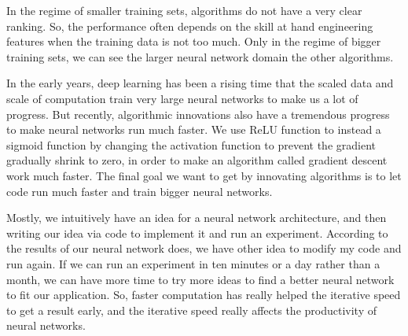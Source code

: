 \documentclass[a4paper]{article}
\begin{document}
In the regime of smaller training sets, algorithms do not have a very clear ranking. So, the performance often depends on the skill at hand engineering features when the training data is not too much. Only in the regime of bigger training sets, we can see the larger neural network domain the other algorithms. 

In the early years, deep learning has been a rising time that the scaled data and scale of computation train very large neural networks to make us a lot of progress. But recently, algorithmic innovations also have a tremendous progress to make neural networks run much faster. We use ReLU function to instead a sigmoid function by changing the activation function to prevent the gradient gradually shrink to zero, in order to make an algorithm called gradient descent work much faster. The final goal we want to get by innovating algorithms is to let code run much faster and train bigger neural networks. 

Mostly, we intuitively have an idea for a neural network architecture, and then writing our idea via code to implement it and run an experiment. According to the results of our neural network does, we have other idea to modify my code and run again. If we can run an experiment in ten minutes or a day rather than a month, we can have more time to try more ideas to find a better neural network to fit our application. So, faster computation has really helped the iterative speed to get a result early, and the iterative speed really affects the productivity of neural networks.


{\small


}
\end{document}
